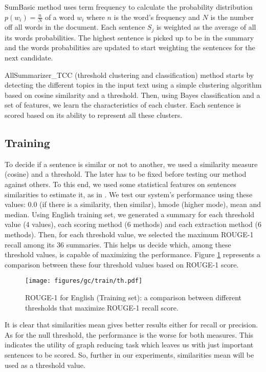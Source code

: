 SumBasic method \citep{05-nenkova-vanderwende} uses term frequency to calculate the probability distribution $ p(w_i) = \frac{n}{N} $ of a word $ w_i $ where $ n $ is the word's frequency and $ N $ is the number off all words in the document. 
Each sentence $ S_j $ is weighted as the average of all its words probabilities.
The highest sentence is picked up to be in the summary and the words probabilities are updated to start weighting the sentences for the next candidate.

AllSummarizer\_TCC (threshold clustering and classification) method \citep{15-aries-al} starts by detecting the different topics in the input text using a simple clustering algorithm based on cosine similarity and a threshold.
Then, using Bayes classification and a set of features, we learn the characteristics of each cluster. 
Each sentence is scored based on its ability to represent all these clusters. 


\subsection{Training}

To decide if a sentence is similar or not to another, we used a similarity measure (cosine) and a threshold. 
The later has to be fixed before testing our method against others. 
To this end, we used some statistical features on sentences similarities to estimate it, as in \citep{15-aries-al}. 
We test our system's performance using these values: 0.0 (if there is a similarity, then similar), hmode (higher mode), mean and median. 
Using English training set, we generated a summary for each threshold value (4 values), each scoring method (6 methods) and each extraction method (6 methods). 
Then, for each threshold value, we selected the maximum ROUGE-1 recall among its 36 summaries. 
This helps us decide which, among these threshold values, is capable of maximizing the performance.
Figure \ref{fig:th} represents a comparison between these four threshold values based on ROUGE-1 score. 
%
\begin{figure}[ht]
	\centering
	\texttt{[image: figures/gc/train/th.pdf]} %
	\caption{ROUGE-1 for English (Training set):  a comparison between 
		different thresholds that maximize ROUGE-1 recall score.}
	\label{fig:th}
\end{figure}

It is clear that similarities mean gives better results either for recall or precision. 
As for the null threshold, the performance is the worse for both measures.
This indicates the utility of graph reducing task which leaves us with just important sentences to be scored. 
So, further in our experiments, similarities mean will be used as a threshold value. 

